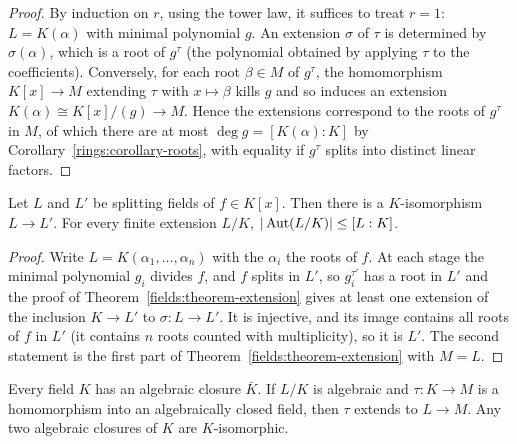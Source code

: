 \begin{proof}
By induction on $r$, using the tower law, it suffices to treat $r = 1$: $L = K(\alpha)$ with
minimal polynomial $g$. An extension $\sigma$ of $\tau$ is determined by $\sigma(\alpha)$, which is a
root of $g^\tau$ (the polynomial obtained by applying $\tau$ to the coefficients).
Conversely, for each root $\beta \in M$ of $g^\tau$, the homomorphism
$K[x] \to M$ extending $\tau$ with $x \mapsto \beta$ kills $g$ and so induces an extension
$K(\alpha) \cong K[x]/(g) \to M$. Hence the extensions correspond to the roots of $g^\tau$ in $M$,
of which there are at most $\deg g = [K(\alpha) : K]$ by Corollary~\ref{rings:corollary-roots},
with equality if $g^\tau$ splits into distinct linear factors.
\end{proof}

\begin{corollary}\label{fields:corollary-splitting-unique}
Let $L$ and $L'$ be splitting fields of $f \in K[x]$. Then there is a $K$-isomorphism
$L \to L'$. For every finite extension $L/K$, $|\operatorname{Aut}(L/K)| \leq [L : K]$.
\end{corollary}

\begin{proof}
Write $L = K(\alpha_1, \ldots, \alpha_n)$ with the $\alpha_i$ the roots of $f$. At each stage the
minimal polynomial $g_i$ divides $f$, and $f$ splits in $L'$, so $g_i^{\tau'}$ has a root in $L'$
and the proof of Theorem~\ref{fields:theorem-extension} gives at least one extension of
the inclusion $K \to L'$ to $\sigma \colon L \to L'$. It is injective, and its image contains all
roots of $f$ in $L'$ (it contains $n$ roots counted with multiplicity), so it is $L'$. The
second statement is the first part of Theorem~\ref{fields:theorem-extension} with
$M = L$.
\end{proof}

\begin{theorem}\label{fields:theorem-algebraic-closure}
Every field $K$ has an algebraic closure $\bar K$. If $L/K$ is algebraic and $\tau \colon K \to M$ is
a homomorphism into an algebraically closed field, then $\tau$ extends to $L \to M$. Any two
algebraic closures of $K$ are $K$-isomorphic.
\end{theorem}

